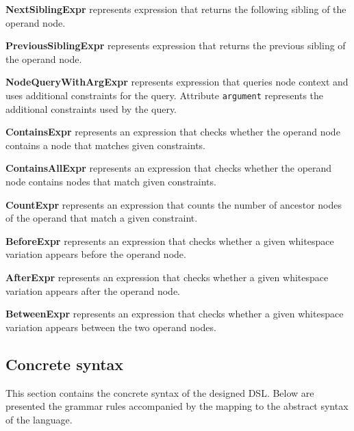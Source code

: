 \begin{description}

\item\textbf{NextSiblingExpr} represents expression that returns the following sibling of the operand node.

\item\textbf{PreviousSiblingExpr} represents expression that returns the previous sibling of the operand node.

\item\textbf{NodeQueryWithArgExpr} represents expression that queries node context and uses additional constraints for the query. Attribute \texttt{argument} represents the additional constraints used by the query.

\item\textbf{ContainsExpr} represents an expression that checks whether the operand node contains a node that matches given constraints.

\item\textbf{ContainsAllExpr} represents an expression that checks whether the operand node contains nodes that match given constraints.

\item\textbf{CountExpr} represents an expression that counts the number of ancestor nodes of the operand that match a given constraint.

\item\textbf{BeforeExpr} represents an expression that checks whether a given whitespace variation appears before the operand node.

\item\textbf{AfterExpr} represents an expression that checks whether a given whitespace variation appears after the operand node.

\item\textbf{BetweenExpr} represents an expression that checks whether a given whitespace variation appears between the two operand nodes.

\end{description}

\subsection{Concrete syntax}

This section contains the concrete syntax of the designed DSL. Below are presented the grammar rules accompanied by the mapping to the abstract syntax of the language.


